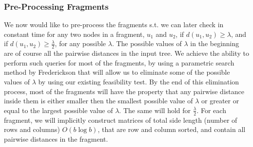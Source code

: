 \documentclass[11pt,a4paper]{article}
\theoremstyle{definition}
\theoremstyle{remark}
\begin{document}
\subsubsection{Pre-Processing Fragments} \label{Pre-Processing Fragments}
We now would like to pre-process the fragments s.t. we can later check in constant time for any two nodes in a fragment, $u_1$ and $u_2$, if $d(u_1,u_2)\geq\lambda$, and if $d(u_1,u_2) \geq \frac{\lambda}{2}$, for any possible $\lambda$. The possible values of $\lambda$ in the beginning are of course all the pairwise distances in the input tree. We achieve the ability to perform such queries for most of the fragments, by using a parametric search method by Frederickson that will allow us to eliminate some of the possible values of $\lambda$ by using our existing feasibility test. By the end of this elimination process, most of the fragments will have the property that any pairwise distance inside them is either smaller then the smallest possible value of $\lambda$ or
 greater or equal to the largest possible value of $\lambda$. The same will hold for $\frac{\lambda}{2}$.
For each fragment, we will implicitly construct matrices of total side length (number of rows and columns) $O(b \log b)$, that are row and column sorted, and contain all pairwise distances in the fragment.
\end{document}
